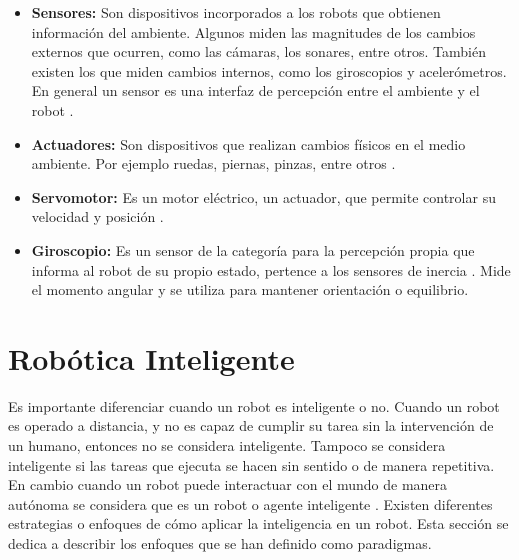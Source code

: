 \begin{itemize}
\item{\textbf{Sensores:} Son dispositivos incorporados a los robots que obtienen información del ambiente. Algunos miden las magnitudes de los cambios externos que ocurren, como las c\'amaras, los sonares, entre otros. Tambi\'en existen los que miden cambios internos, como los giroscopios y aceler\'ometros. En general un sensor es una interfaz de percepci\'on entre el ambiente y el robot \cite{peterNorvig}.}


\item{\textbf{Actuadores:} Son dispositivos que realizan cambios f\'isicos en el medio ambiente. Por ejemplo ruedas, piernas, pinzas, entre otros \cite{peterNorvig}.}

\item{\textbf{Servomotor:}  Es un motor eléctrico, un actuador, que permite controlar su velocidad y posici\'on  \cite{AiRobotics}. }


\item{\textbf{Giroscopio:} Es un sensor de la categor\'ia para la percepci\'on propia que informa al robot de su propio estado, pertence a los sensores de inercia \cite{peterNorvig}. Mide el momento angular y se utiliza para mantener orientaci\'on o equilibrio.}

\end{itemize}

\section{Robótica Inteligente} \label{sect:AgentesInteligentes}

Es importante diferenciar cuando un robot es inteligente o no. Cuando un robot es operado a distancia, y no es capaz de cumplir su tarea sin la intervención de un humano, entonces no se considera  inteligente. Tampoco se considera inteligente si las tareas que ejecuta se hacen sin sentido o de manera repetitiva. En cambio cuando un robot puede interactuar con el mundo de manera autónoma se considera que es un robot o agente inteligente \cite{AiRobotics}. Existen diferentes estrategias o enfoques de cómo aplicar la inteligencia en un robot. Esta sección se dedica a describir los enfoques que se han definido como paradigmas. 

